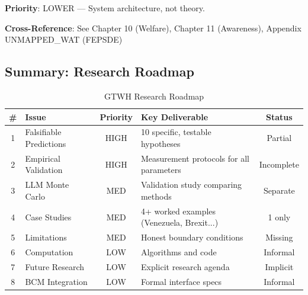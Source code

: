 \begin{tcolorbox}[colback=green!5!white, colframe=green!75!black, title=Status: Informal References Only]
\textbf{Priority}: \colorbox{green!20}{LOWER} --- System architecture, not theory.

\textbf{Cross-Reference}: See Chapter 10 (Welfare), Chapter 11 (Awareness), Appendix UNMAPPED_WAT (FEPSDE)
\end{tcolorbox}

\subsection{Summary: Research Roadmap}

\begin{table}[htbp]
\centering
\caption{GTWH Research Roadmap}
\label{tab:aaa-roadmap}
\renewcommand{\arraystretch}{1.3}
\small
\begin{tabular}{@{}clcp{5cm}c@{}}
\toprule
\textbf{\#} & \textbf{Issue} & \textbf{Priority} & \textbf{Key Deliverable} & \textbf{Status} \\
\midrule
1 & Falsifiable Predictions & \colorbox{red!20}{HIGH} & 10 specific, testable hypotheses & Partial \\
2 & Empirical Validation & \colorbox{red!20}{HIGH} & Measurement protocols for all parameters & Incomplete \\
3 & LLM Monte Carlo & \colorbox{yellow!20}{MED} & Validation study comparing methods & Separate \\
4 & Case Studies & \colorbox{yellow!20}{MED} & 4+ worked examples (Venezuela, Brexit...) & 1 only \\
5 & Limitations & \colorbox{yellow!20}{MED} & Honest boundary conditions & Missing \\
6 & Computation & \colorbox{green!20}{LOW} & Algorithms and code & Informal \\
7 & Future Research & \colorbox{green!20}{LOW} & Explicit research agenda & Implicit \\
8 & BCM Integration & \colorbox{green!20}{LOW} & Formal interface specs & Informal \\
\bottomrule
\end{tabular}
\end{table}

